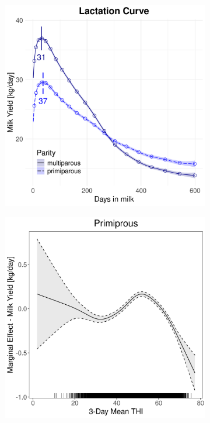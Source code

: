 \begin{figure}[H]
\begin{subfigure}[b]{0.45\textwidth}
        \includegraphics[width=\textwidth]{thesis/figures/models/milk/full/ho_milk_full/ho_milk_full_marginal_dim_milk_combined.png}
    \end{subfigure}
    \begin{subfigure}[b]{0.45\textwidth}
        \centering
        \includegraphics[width=\textwidth]{thesis/figures/models/milk/full/ho_milk_full/ho_milk_full_marginal_thi_milk_primi.png}

\end{subfigure}
\end{figure}
